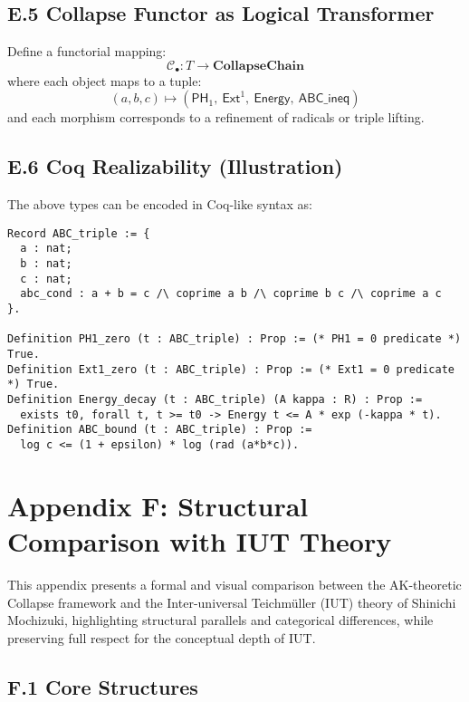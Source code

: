 \documentclass[11pt]{article}
\begin{document}
\subsection*{E.5 Collapse Functor as Logical Transformer}

Define a functorial mapping:
\[
\mathcal{C}_\bullet : T \to \mathbf{CollapseChain}
\]
where each object maps to a tuple:
\[
(a,b,c) \mapsto (\mathsf{PH}_1,\ \mathsf{Ext}^1,\ \mathsf{Energy},\ \mathsf{ABC\_ineq})
\]
and each morphism corresponds to a refinement of radicals or triple lifting.

\subsection*{E.6 Coq Realizability (Illustration)}

The above types can be encoded in Coq-like syntax as:

\begin{verbatim}
Record ABC_triple := {
  a : nat;
  b : nat;
  c : nat;
  abc_cond : a + b = c /\ coprime a b /\ coprime b c /\ coprime a c
}.

Definition PH1_zero (t : ABC_triple) : Prop := (* PH1 = 0 predicate *) True.
Definition Ext1_zero (t : ABC_triple) : Prop := (* Ext1 = 0 predicate *) True.
Definition Energy_decay (t : ABC_triple) (A kappa : R) : Prop :=
  exists t0, forall t, t >= t0 -> Energy t <= A * exp (-kappa * t).
Definition ABC_bound (t : ABC_triple) : Prop :=
  log c <= (1 + epsilon) * log (rad (a*b*c)).
\end{verbatim}



\section*{Appendix F: Structural Comparison with IUT Theory}

This appendix presents a formal and visual comparison between the AK-theoretic Collapse framework  
and the Inter-universal Teichmüller (IUT) theory of Shinichi Mochizuki, highlighting structural parallels  
and categorical differences, while preserving full respect for the conceptual depth of IUT.

\subsection*{F.1 Core Structures}
\end{document}
